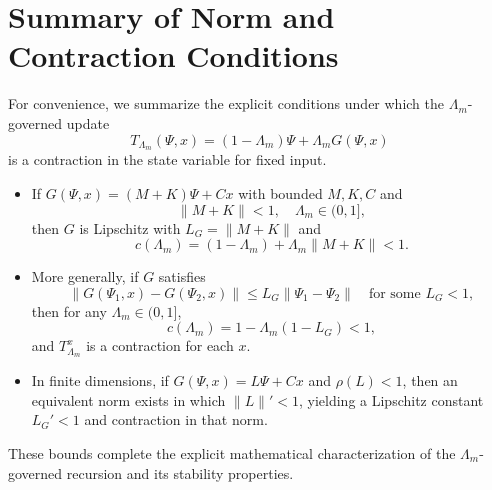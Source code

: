 \documentclass[11pt]{article}
\begin{document}
\section{Summary of Norm and Contraction Conditions}

For convenience, we summarize the explicit conditions under which the $\Lambda_m$-governed update
\[
  T_{\Lambda_m}(\Psi,x)
  =
  (1 - \Lambda_m)\Psi + \Lambda_m G(\Psi,x)
\]
is a contraction in the state variable for fixed input.

\begin{itemize}
  \item If $G(\Psi,x) = (M+K)\Psi + Cx$ with bounded $M,K,C$ and
    \[
      \|M+K\| < 1,
      \quad \Lambda_m \in (0,1],
    \]
    then $G$ is Lipschitz with $L_G = \|M+K\|$ and
    \[
      c(\Lambda_m) = (1 - \Lambda_m) + \Lambda_m \|M+K\| < 1.
    \]
  \item More generally, if $G$ satisfies
    \[
      \|G(\Psi_1,x) - G(\Psi_2,x)\|
      \leq L_G \|\Psi_1 - \Psi_2\|
      \quad \text{for some } L_G < 1,
    \]
    then for any $\Lambda_m \in (0,1]$,
    \[
      c(\Lambda_m) = 1 - \Lambda_m(1 - L_G) < 1,
    \]
    and $T_{\Lambda_m}^x$ is a contraction for each $x$.
  \item In finite dimensions, if $G(\Psi,x) = L\Psi + Cx$ and $\rho(L) < 1$, then an equivalent norm exists in which $\|L\|' < 1$, yielding a Lipschitz constant $L_G' < 1$ and contraction in that norm.
\end{itemize}

These bounds complete the explicit mathematical characterization of the $\Lambda_m$-governed recursion and its stability properties.


\nocite{*}


\end{document}

